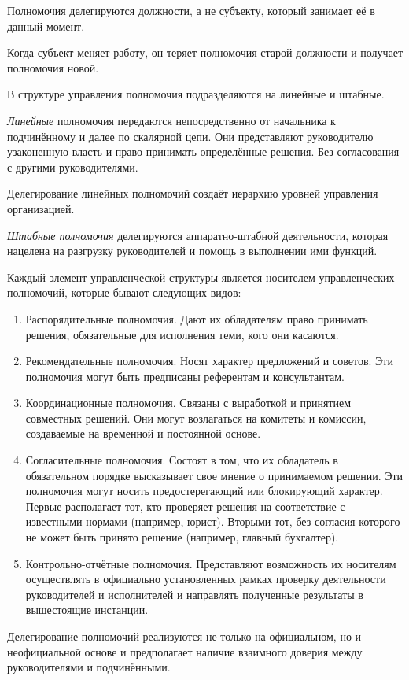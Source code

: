 \documentclass[12pt, russian, oneside, article]{ncc}
\begin{document}
Полномочия делегируются должности, а не субъекту, который занимает её в данный момент.

Когда субъект меняет работу, он теряет полномочия старой должности и получает полномочия новой.

В структуре управления полномочия подразделяются на линейные и штабные. 

\emph{Линейные} полномочия передаются непосредственно от начальника к подчинённому и далее по скалярной цепи. Они представляют руководителю узаконенную власть и право принимать определённые решения. Без согласования с другими руководителями.

Делегирование линейных полномочий создаёт иерархию уровней управления организацией.

\emph{Штабные полномочия} делегируются аппаратно-штабной деятельности, которая нацелена на разгрузку руководителей и помощь в выполнении ими функций.

Каждый элемент управленческой структуры является носителем управленческих полномочий, которые бывают следующих видов:
\begin{enumerate}
\item Распорядительные полномочия. Дают их обладателям право принимать решения, обязательные для исполнения теми, кого они касаются.
\item Рекомендательные полномочия. Носят характер предложений и советов. Эти полномочия могут быть предписаны референтам и консультантам.
\item Координационные полномочия. Связаны с выработкой и принятием совместных решений. Они могут возлагаться на комитеты и комиссии, создаваемые на временной и постоянной основе.
\item Согласительные полномочия. Состоят в том, что их обладатель в обязательном порядке высказывает свое мнение о принимаемом решении. Эти полномочия могут носить предостерегающий или блокирующий характер. Первые располагает тот, кто проверяет решения на соответствие с известными нормами (например, юрист). Вторыми тот, без согласия которого не может быть принято решение (например, главный бухгалтер).
\item Контрольно-отчётные полномочия. Представляют возможность их носителям осуществлять в официально установленных рамках проверку деятельности руководителей и исполнителей и направлять полученные результаты в вышестоящие инстанции.
\end{enumerate}

Делегирование полномочий реализуются не только на официальном, но и неофициальной основе и предполагает наличие взаимного доверия между руководителями и подчинёнными.
\end{document}
